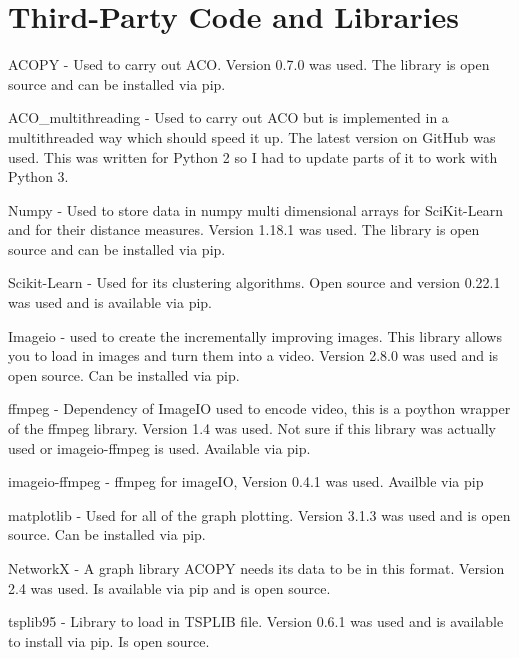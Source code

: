 \chapter{Third-Party Code and Libraries}

ACOPY - Used to carry out ACO. Version 0.7.0 was used. The library is open source and can be installed via pip.

ACO\_multithreading - Used to carry out ACO but is implemented in a multithreaded way which should speed it up. The latest version on GitHub was used\cite{multithreaded_aco}. This was written for Python 2 so I had to update parts of it to work with Python 3. 

Numpy - Used to store data in numpy multi dimensional arrays for SciKit-Learn and for their distance measures. Version 1.18.1 was used. The library is open source and can be installed via pip.

Scikit-Learn - Used for its clustering algorithms. Open source and version 0.22.1 was used and is available via pip.

Imageio - used to create the incrementally improving images. This library allows you to load in images and turn them into a video. Version 2.8.0 was used and is open source. Can be installed via pip.

ffmpeg - Dependency of ImageIO used to encode video, this is a poython wrapper of the ffmpeg library. Version 1.4 was used. Not sure if this library was actually used or imageio-ffmpeg is used. Available via pip.

imageio-ffmpeg - ffmpeg for imageIO, Version 0.4.1 was used. Availble via pip

matplotlib - Used for all of the graph plotting. Version 3.1.3 was used and is open source. Can be installed via pip.

NetworkX - A graph library ACOPY needs its data to be in this format. Version 2.4 was used. Is available via pip and is open source.

tsplib95 - Library to load in TSPLIB file. Version 0.6.1 was used and is available to install via pip. Is open source.

